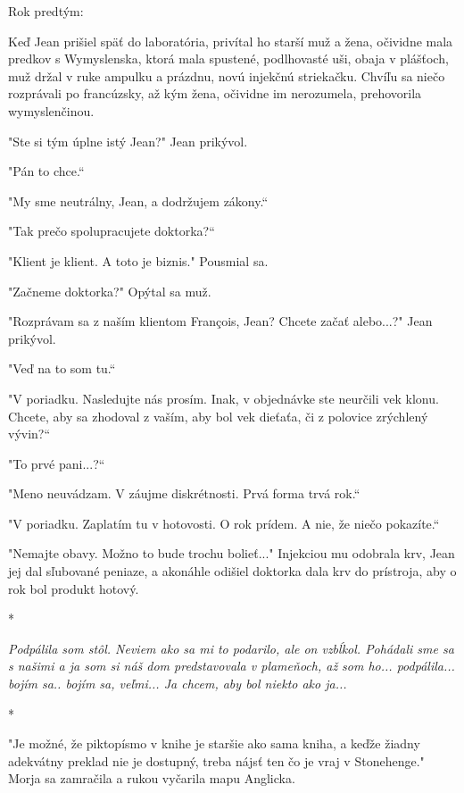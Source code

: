 \documentclass{book}
\begin{document}
Rok predtým:

Keď Jean prišiel späť do laboratória, privítal ho starší muž a žena, očividne mala predkov s Wymyslenska, ktorá mala spustené, podlhovasté uši, obaja v plášťoch, muž držal v ruke ampulku a prázdnu, novú injekčnú striekačku. Chvíľu sa niečo rozprávali po francúzsky, až kým žena, očividne im nerozumela, prehovorila wymyslenčinou.

"Ste si tým úplne istý Jean?"$ $ Jean prikývol.

"Pán to chce.“

"My sme neutrálny, Jean, a dodržujem zákony.“

"Tak prečo spolupracujete doktorka?“

"Klient je klient. A toto je biznis."$ $ Pousmial sa.

"Začneme doktorka?"$ $ Opýtal sa muž.

"Rozprávam sa z naším klientom François, Jean? Chcete začať alebo...?"$ $ Jean prikývol.

"Veď na to som tu.“

"V poriadku. Nasledujte nás prosím. Inak, v objednávke ste neurčili vek klonu. Chcete, aby sa zhodoval z vaším, aby bol vek dieťaťa, či z polovice zrýchlený vývin?“

"To prvé pani...?“

"Meno neuvádzam. V záujme diskrétnosti. Prvá forma trvá rok.“

"V poriadku. Zaplatím tu v hotovosti. O rok prídem. A nie, že niečo pokazíte.“

"Nemajte obavy. Možno to bude trochu bolieť..."$ $ Injekciou mu odobrala krv, Jean jej dal sľubované peniaze, a akonáhle odišiel doktorka dala krv do prístroja, aby o rok bol produkt hotový.

\begin{center}
*
\end{center}

\textit{Podpálila som stôl. Neviem ako sa mi to podarilo, ale on vzbĺkol. Pohádali sme sa s našimi a ja som si náš dom predstavovala v plameňoch, až som ho... podpálila... bojím sa.. bojím sa, veľmi... Ja chcem, aby bol niekto ako ja...}

\begin{center}
*
\end{center}

"Je možné, že piktopísmo v knihe je staršie ako sama kniha, a keďže žiadny adekvátny preklad nie je dostupný, treba nájsť ten čo je vraj v Stonehenge."$ $ Morja sa zamračila a rukou vyčarila mapu Anglicka.
\end{document}
